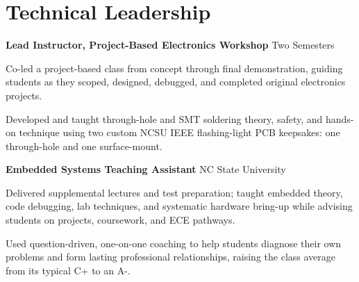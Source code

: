 \documentclass[10pt,letterpaper]{article}
\begin{document}
\section{Technical Leadership}
\textbf{Lead Instructor, Project-Based Electronics Workshop} \hfill Two Semesters\\
\begin{compactitem}
  \item Co-led a project-based class from concept through final demonstration, guiding students as they scoped, designed, debugged, and completed original electronics projects.
  \item Developed and taught through-hole and SMT soldering theory, safety, and hands-on technique using two custom NCSU IEEE flashing-light PCB keepsakes: one through-hole and one surface-mount.
\end{compactitem}

\textbf{Embedded Systems Teaching Assistant} \hfill NC State University\\
\begin{compactitem}
  \item Delivered supplemental lectures and test preparation; taught embedded theory, code debugging, lab techniques, and systematic hardware bring-up while advising students on projects, coursework, and ECE pathways.
  \item Used question-driven, one-on-one coaching to help students diagnose their own problems and form lasting professional relationships, raising the class average from its typical C+ to an A-.
\end{compactitem}
\end{document}
